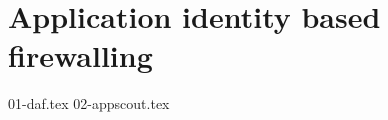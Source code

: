 \chapter{Application identity based firewalling}
\label{appfw:chapter}

{01-daf.tex}
{02-appscout.tex}

